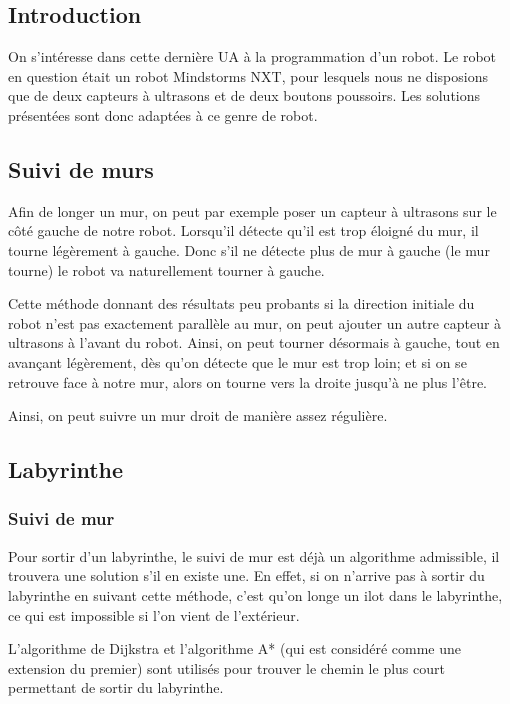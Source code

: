 \subsection{Introduction}

  On s'intéresse dans cette dernière UA à la programmation d'un robot. Le robot
  en question était un robot Mindstorms NXT, pour lesquels nous ne disposions
  que de deux capteurs à ultrasons et de deux boutons poussoirs. Les solutions
  présentées sont donc adaptées à ce genre de robot.

\subsection{Suivi de murs}
  Afin de longer un mur, on peut par exemple poser un capteur à ultrasons sur
  le côté gauche de notre robot. Lorsqu'il détecte qu'il est trop
  éloigné du mur, il tourne légèrement à gauche. Donc s'il ne détecte plus
  de mur à gauche (le mur tourne) le robot va naturellement tourner à gauche.

  Cette méthode donnant des résultats peu probants si la direction initiale du
  robot n'est pas exactement parallèle au mur, on peut ajouter un autre capteur
  à ultrasons à l'avant du robot. Ainsi, on peut tourner désormais à gauche,
  tout en avançant légèrement, dès qu'on détecte que le mur est trop loin; et
  si on se retrouve face à notre mur, alors on tourne vers la droite jusqu'à ne
  plus l'être.

  Ainsi, on peut suivre un mur droit de manière assez régulière.

\subsection{Labyrinthe}\label{sec:laby}
  \subsubsection{Suivi de mur}
    Pour sortir d'un labyrinthe, le suivi de mur est déjà un algorithme
    admissible, il trouvera une solution s'il en existe une. En effet, si on
    n'arrive pas à sortir du labyrinthe en suivant cette méthode, c'est qu'on 
    longe un ilot dans le labyrinthe, ce qui est impossible si l'on vient
    de l'extérieur.

    L'algorithme de Dijkstra et l'algorithme A* (qui est considéré comme une
    extension du premier) sont utilisés pour trouver le chemin le plus court
    permettant de sortir du labyrinthe.

